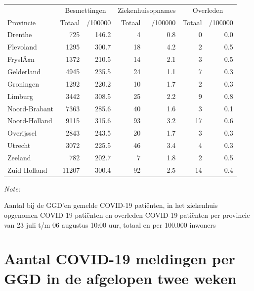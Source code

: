 \documentclass[
  english,
  man,floatsintext]{apa6}
\begin{document}
\begin{table}
\centering
\begin{threeparttable}
\begin{tabular}{lrrrrrr}
\toprule
\multicolumn{1}{c}{ } & \multicolumn{2}{c}{Besmettingen} & \multicolumn{2}{c}{Ziekenhuisopnames} & \multicolumn{2}{c}{Overleden} \\
\cmidrule(l{3pt}r{3pt}){2-3} \cmidrule(l{3pt}r{3pt}){4-5} \cmidrule(l{3pt}r{3pt}){6-7}
Provincie & Totaal & /100000 & Totaal & /100000 & Totaal & /100000\\
\midrule
Drenthe & 725 & 146.2 & 4 & 0.8 & 0 & 0.0\\
Flevoland & 1295 & 300.7 & 18 & 4.2 & 2 & 0.5\\
FryslÃ¢n & 1372 & 210.5 & 14 & 2.1 & 3 & 0.5\\
Gelderland & 4945 & 235.5 & 24 & 1.1 & 7 & 0.3\\
Groningen & 1292 & 220.2 & 10 & 1.7 & 2 & 0.3\\
Limburg & 3442 & 308.5 & 25 & 2.2 & 9 & 0.8\\
Noord-Brabant & 7363 & 285.6 & 40 & 1.6 & 3 & 0.1\\
Noord-Holland & 9115 & 315.6 & 93 & 3.2 & 17 & 0.6\\
Overijssel & 2843 & 243.5 & 20 & 1.7 & 3 & 0.3\\
Utrecht & 3072 & 225.5 & 46 & 3.4 & 4 & 0.3\\
Zeeland & 782 & 202.7 & 7 & 1.8 & 2 & 0.5\\
Zuid-Holland & 11207 & 300.4 & 92 & 2.5 & 14 & 0.4\\
\bottomrule
\end{tabular}
\begin{tablenotes}
\item \textit{Note: } 
\item Aantal bij de GGD’en gemelde COVID-19 patiënten, in het ziekenhuis opgenomen COVID-19 patiënten en overleden COVID-19 patiënten per provincie van 23 juli t/m 06 augustus 10:00 uur, totaal en per 100.000 inwoners
\end{tablenotes}
\end{threeparttable}
\end{table}

\newpage

\hypertarget{aantal-covid-19-meldingen-per-ggd-in-de-afgelopen-twee-weken}{%
\section{Aantal COVID-19 meldingen per GGD in de afgelopen twee weken}\label{aantal-covid-19-meldingen-per-ggd-in-de-afgelopen-twee-weken}}
\end{document}
